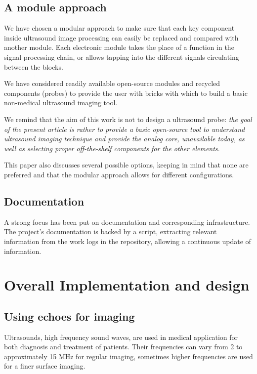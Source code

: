 \documentclass[letterpaper, 10 pt, conference]{ieeeconf} %
\begin{document}
\subsection{A module approach}

We have chosen a modular approach to make sure that each key component inside ultrasound image processing can easily be replaced and compared with another module. Each electronic module takes the place of a function in the signal processing chain, or allows tapping into the different signals circulating between the blocks.

We have considered readily available open-source modules and recycled components (probes) to provide the user with bricks with which to build a basic non-medical ultrasound imaging tool. 

We remind that the aim of this work is not to design a ultrasound probe: \textit{the goal of the present article is rather to provide a basic open-source tool to understand ultrasound imaging technique and provide the analog core, unavailable today, as well as selecting proper off-the-shelf components for the other elements}.

This paper also discusses several possible options, keeping in mind that none are preferred and that the modular approach allows for different configurations. 

\subsection{Documentation}

A strong focus has been put on documentation and corresponding infrastructure. The project's documentation is backed by a script, extracting relevant information from the work logs in the repository, allowing a continuous update of information.

\section{Overall Implementation and design}

\subsection{Using echoes for imaging}

Ultrasounds, high frequency sound waves, are used in medical application for both diagnosis and treatment of patients. Their frequencies can vary from 2 to approximately 15 MHz for regular imaging, sometimes higher frequencies are used for a finer surface imaging.
\end{document}
